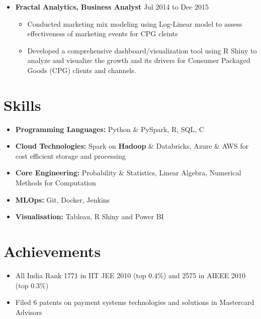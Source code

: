 \documentclass[a4paper,10pt]{article}
\begin{document}
\begin{itemize}[leftmargin=0.2cm, label={}]
    \item \textbf{Fractal Analytics, Business Analyst} \hfill \textnormal{Jul 2014 to Dec 2015}
    \begin{itemize}[leftmargin=0.5cm, label={\textbullet}]
        \item Conducted marketing mix modeling using Log-Linear model to assess effectiveness of marketing events for CPG cleints 
        \item Developed a comprehensive dashboard/visualization tool using R Shiny to analyze and visualize the growth and its drivers for Consumer Packaged Goods (CPG) clients
        and channels.
    \end{itemize}
\end{itemize}

\section*{Skills}
\begin{itemize}[leftmargin=0.2cm, label={}]
    \item \textbf{Programming Languages:} Python \& PySpark, R, SQL, C
    \item \textbf{Cloud Technologies:} Spark on {\textbf{Hadoop}} \& Databricks, Azure \& AWS for cost efficient storage and processing
    \item \textbf{Core Engineering:} Probability \& Statistics, Linear Algebra, Numerical Methods for Computation
    \item \textbf{MLOps:} Git, Docker, Jenkins
    \item \textbf{Visualisation:} Tableau, R Shiny and Power BI
\end{itemize}

\section*{Achievements}
\begin{itemize}[leftmargin=0.2cm, label={}]
    \item All India Rank 1771 in IIT JEE 2010 (top 0.4\%) and 2575 in AIEEE 2010 (top 0.3\%)
    \item Filed 6 patents on payment systems technologies and solutions in Mastercard Advisors
\end{itemize}
\end{document}
